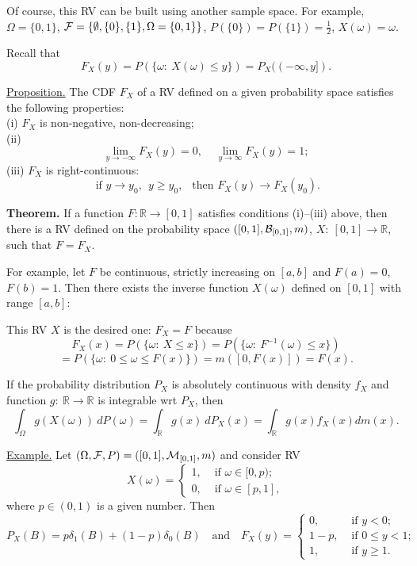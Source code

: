 \documentclass[a4paper,10pt]{article}
\def\RR{\mathbb{R}}
\newcommand{\1}[1]{\mathbf{1}_{\{#1\}}}
\begin{document}
Of course, this RV can be built using another sample space. For example, $\Omega=\{0,1\}$, ${\cal F}=\{\emptyset, \{0\}, \{1\}, \Omega=\{0,1\} \}$, $P(\{0\})=P(\{1\})=\frac{1}{2}$, $X(\omega)=\omega$. \vspace{3mm}

Recall that
  $$F_X(y)=P(\{\omega:~X(\omega)\le y\})=P_X((-\infty,y]).$$ \vspace{3mm}

\underline{Proposition.} The CDF $F_X$ of a RV defined on a given probability space satisfies the following properties:\\
(i) $F_X$ is non-negative, non-decreasing;\\
(ii) $$\lim_{y\to -\infty} F_X(y)=0,~~~~~\lim_{y\to \infty} F_X(y)=1;$$
(iii) $F_X$ is right-continuous:
  $$\mbox{ if } y\to y_0,~~y\ge y_0,~~\mbox{ then } F_X(y)\to F_X(y_0).$$\vspace{3mm}

{\bf Theorem.} If a function $F:\RR\to [0,1]$ satisfies conditions (i)--(iii) above, then there is a RV defined on the probability space $([0,1],{\cal B}_{[0,1]},m)$, $X:~[0,1]\to\RR$, such that $F=F_X$. \vspace{5cm}

For example, let $F$ be continuous, strictly increasing on $[a,b]$ and $F(a)=0$, $F(b)=1$. Then there exists the inverse function $X(\omega)$ defined on $[0,1]$ with range $[a,b]$: \vspace{5cm}

This RV $X$ is the desired one: $F_X=F$ because
  $$F_X(x)=P(\{\omega:~X\le x\})=P(\{\omega:~ F^{-1}(\omega)\le x\})$$
  $$=P(\{\omega:~0\le \omega\le F(x)\})=m([0,F(x)])=F(x).$$
\vspace{3mm}

If the probability distribution $P_X$ is absolutely continuous with density $f_X$ and function $g:~\RR\to \RR$ is integrable wrt $P_X$, then
  $$\int_\Omega g(X(\omega))~dP(\omega)=\int_\RR g(x)~dP_X(x)=\int_\RR g(x) f_X(x) dm(x).$$\vspace{3mm}

\underline{Example.} Let $(\Omega,{\cal F},P)=([0,1],{\cal M}_{[0,1]},m)$ and consider RV
  $$X(\omega)=\left\{\begin{array}{ll} 1, & \mbox{ if } \omega\in[0,p); \\ 0, & \mbox{ if } \omega\in[p,1],
\end{array}\right. $$
where $p\in(0,1)$ is a given number. Then
  $$P_X(B)=p\delta_1(B)+(1-p)\delta_0(B)~~~\mbox{ and }~~~F_X(y)=\left\{\begin{array}{ll} 0, & \mbox{ if } y<0;\\ 1-p, & \mbox{ if } 0\le y<1; \\ 1, & \mbox{ if } y\ge 1.\end{array}\right. $$
\vspace{5cm}
\end{document}
